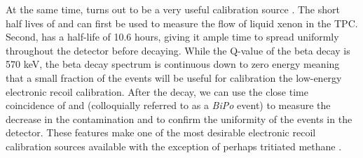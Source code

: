 At the same time,  turns out to be a very useful calibration source \cite{aprile2017results}.  The short half lives of  and  can first be used to measure the flow of liquid xenon in the TPC.  Second,  has a half-life of 10.6 hours, giving it ample time to spread uniformly throughout the detector before decaying.  While the Q-value of the beta decay is 570 keV, the beta decay spectrum is continuous down to zero energy meaning that a small fraction of the events will be useful for calibration the low-energy electronic recoil calibration.  After the  decay, we can use the close time coincidence of  and  (colloquially referred to as a \textit{BiPo} event) to measure the decrease in the contamination and to confirm the uniformity of the  events in the detector.  These features make  one of the most desirable electronic recoil calibration sources available with the exception of perhaps tritiated methane \cite{akerib2016tritium, aprile2017tritium}.


